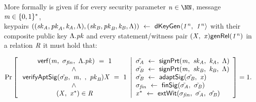 \begin{definition}[\cnstAptSigCorrectness]
    \label{def:aptSigCorrectness}
    More formally \cnstAptSigCorrectness is given if for every security parameter $\varN \in \cnstNatural$, message $\mathit{m} \in \{0,1\}^{*}$, \\ keypairs
    $((\mathit{sk}_{\mathit{A}}, \mathit{pk}_{\mathit{A}}, \mathit{\mathit{k}_{\mathit{A}}}, \Lambda), (\mathit{sk}_{\mathit{B}}, \mathit{pk}_{\mathit{B}}, \mathit{\mathit{k}_{\mathit{B}}}, \Lambda)) ~\leftarrow~ \mathsf{dKeyGen}\langle \mathit{1^n} ,~ \mathit{1^n} \rangle$
    with their composite public key $\Lambda.\mathit{pk}$
    and every statement/witness pair $(\mathit{X} ,~ \mathit{x}) \mathsf{genRel}(\mathit{1^n})$ in a relation $\mathit{R}$ it must hold that:

    \[
        \Pr\left[
        \begin{array}{c}
            \:\mathsf{verf}(\mathit{m} ,~ \sigma_{\mathit{fin}} ,~ \Lambda.\mathit{pk}) ~=~ 1                                         \\
            ~\land~                                                                                              \\
            \: \mathsf{verifyAptSig}(\hat{\sigma_{\mathit{B}}} ,~ \mathit{m} ,~  ,~ \mathit{pk}_{\mathit{B}}){\mathit{X}} ~=~ 1             \\
            ~\land~                                                                                              \\
            \:(\mathit{X} ,~ \mathit{x}^*) \in \mathit{R}
        \end{array}
        \middle\vert
        \begin{array}{l}
            \tilde{\sigma_{\mathit{A}}} ~\leftarrow~ \mathsf{signPrt}(\mathit{m} ,~ \mathit{sk}_{\mathit{A}} ,~ \mathit{\mathit{k}_{\mathit{A}}} ,~ \Lambda)        \\
            \tilde{\sigma_{\mathit{B}}} ~\leftarrow~ \mathsf{signPrt}(\mathit{m} ,~ \mathit{sk}_{\mathit{B}} ,~ \mathit{\mathit{k}_{\mathit{B}}} ,~ \Lambda)              \\
            \hat{\sigma_{\mathit{B}}} ~\leftarrow~ \mathsf{adaptSig}(\tilde{\sigma_{\mathit{B}}} ,~ \mathit{x})                                             \\
            \sigma_{\mathit{fin}} ~\leftarrow~ \mathsf{finSig}(\tilde{\sigma_{\mathit{A}}} ,~ \tilde{\sigma_{\mathit{B}}})                                           \\
            \mathit{x}^* ~\leftarrow~ \mathsf{extWit}(\sigma_{\mathit{fin}} ,~ \tilde{\sigma_{\mathit{A}}} ,~ \hat{\sigma_{\mathit{B}}})
        \end{array}
        \right]=1.
    \]
\end{definition}

